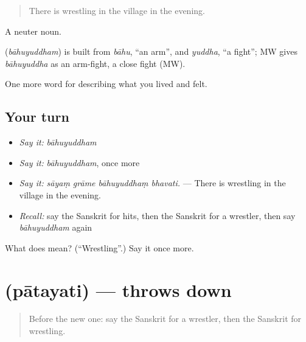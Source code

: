 \begin{quote}
There is wrestling in the village in the evening.
\end{quote}

A neuter noun.

\begin{cousinweb}
\textbf{} (\emph{bāhuyuddham}) is built from \emph{bāhu}, \textquotedblleft{}an arm\textquotedblright{}, and \emph{yuddha}, \textquotedblleft{}a fight\textquotedblright{}; MW gives \emph{bāhuyuddha} as an arm-fight, a close fight (MW).
\end{cousinweb}

\begin{grammarlens}[title={What you've built}]
One more word for describing what you lived and felt.
\end{grammarlens}

\subsection*{Your turn}
\begin{itemize}
\raggedright
  \item \emph{Say it:} \emph{bāhuyuddham}
  \item \emph{Say it:} \emph{bāhuyuddham}, once more
  \item \emph{Say it:} \emph{sāyaṃ grāme bāhuyuddhaṃ bhavati.} — There is wrestling in the village in the evening.
  \item \emph{Recall:} say the Sanskrit for hits, then the Sanskrit for a wrestler, then say \emph{bāhuyuddham} again
\end{itemize}

\begin{tcolorbox}[breakable,colback=teal!4,colframe=teal!35!black,title={Before you move on}]
What does  mean? (\textquotedblleft{}Wrestling\textquotedblright{}.) Say it once more.
\end{tcolorbox}
\section[\texorpdfstring{\sk{पातयति} (pātayati)}{पातयति (pātayati)}]{ (pātayati) — throws down}

\label{lesson:SA-C525-patayati}



\begin{quote}
Before the new one: say the Sanskrit for a wrestler, then the Sanskrit for wrestling.
\end{quote}

